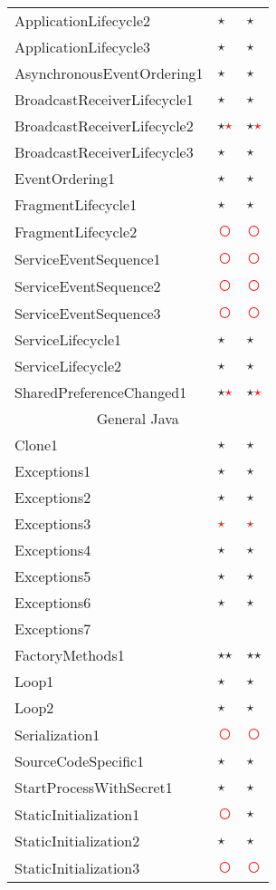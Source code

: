 \documentclass[../draft.tex]{subfiles}
\newcommand{\fp}{{\fontfamily{cmr}\selectfont\textcolor{white}{\textcircled{\textcolor{red}{$\star$}}}}}
\newcommand{\fn}{{\fontfamily{cmr}\selectfont\textcolor{red}{\textcircled{ }}}}
\newcommand{\tp}[0]{{\fontfamily{cmr}\selectfont\textcircled{$\star$}}}
\newcommand{\tsub}[1]{\multicolumn{3}{c}{#1}\\\hline}
\begin{document}
\begin{longtable}{l | l | l}
        ApplicationLifecycle2 & \tp & \tp\\
        ApplicationLifecycle3 & \tp & \tp\\
        AsynchronousEventOrdering1 & \tp & \tp\\
        BroadcastReceiverLifecycle1 & \tp & \tp\\
        BroadcastReceiverLifecycle2 & \tp \fp & \tp \fp\\
        BroadcastReceiverLifecycle3 & \tp & \tp\\
        EventOrdering1 & \tp & \tp\\
        FragmentLifecycle1 & \tp & \tp\\
        FragmentLifecycle2 & \fn & \fn\\
        ServiceEventSequence1 & \fn & \fn\\
        ServiceEventSequence2 & \fn & \fn\\
        ServiceEventSequence3 & \fn & \fn\\
        ServiceLifecycle1 & \tp & \tp\\
        ServiceLifecycle2 & \tp & \tp\\
        SharedPreferenceChanged1 & \tp \fp & \tp \fp\\
        \hline
        \tsub{General Java}
        Clone1 & \tp & \tp\\
        Exceptions1 & \tp & \tp \\
        Exceptions2 & \tp & \tp\\
        Exceptions3 & \fp & \fp \\
        Exceptions4 & \tp & \tp \\
        Exceptions5 & \tp & \tp \\
        Exceptions6 & \tp & \tp\\
        Exceptions7 & &\\
        FactoryMethods1 & \tp \tp & \tp \tp\\
        Loop1 & \tp & \tp\\
        Loop2 & \tp & \tp\\
        Serialization1 & \fn & \fn\\
        SourceCodeSpecific1 & \tp & \tp\\
        StartProcessWithSecret1 & \tp & \tp\\
        StaticInitialization1 & \fn & \tp\\
        StaticInitialization2 & \tp & \tp\\
        StaticInitialization3 & \fn & \fn\\

\end{longtable}
\end{document}
